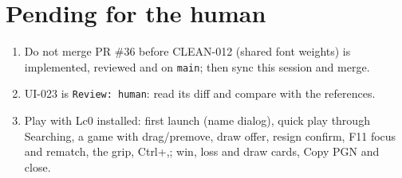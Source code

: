 \documentclass[11pt,a4paper]{article}
\begin{document}
\section*{Pending for the human}

\begin{enumerate}
  \item Do not merge PR \#36 before CLEAN-012 (shared font weights) is implemented, reviewed and
        on \texttt{main}; then sync this session and merge.
  \item UI-023 is \texttt{Review: human}: read its diff and compare
         with the references.
  \item Play with Lc0 installed: first launch (name dialog), quick play through Searching, a game
        with drag/premove, draw offer, resign confirm, F11 focus and rematch, the grip, Ctrl+,;
        win, loss and draw cards, Copy PGN and close.
\end{enumerate}
\end{document}
